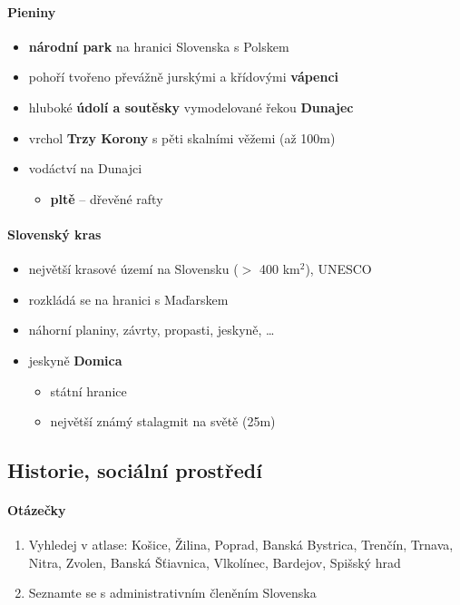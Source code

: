 \paragraph{Pieniny}
\begin{itemize}
\item \textbf{národní park} na hranici Slovenska s Polskem
\item pohoří tvořeno převážně jurskými a křídovými \textbf{vápenci}
\item hluboké \textbf{údolí a soutěsky} vymodelované řekou \textbf{Dunajec}
\item vrchol \textbf{Trzy Korony} s pěti skalními věžemi (až 100m)
\item vodáctví na Dunajci
\begin{itemize}
\item \textbf{pltě} -- dřevěné rafty
\end{itemize}
\end{itemize}

\paragraph{Slovenský kras}
\begin{itemize}
\item největší krasové území na Slovensku ($>$ 400 km$^2$), UNESCO
\item rozkládá se na hranici s Maďarskem
\item náhorní planiny, závrty, propasti, jeskyně, \ldots
\item jeskyně \textbf{Domica}
\begin{itemize}
\item státní hranice
\item největší známý stalagmit na světě (25m)
\end{itemize}
\end{itemize}


\subsection{Historie, sociální prostředí}
\paragraph{Otázečky}
\begin{enumerate}
\item Vyhledej v atlase: Košice, Žilina, Poprad, Banská Bystrica, Trenčín, Trnava, Nitra, Zvolen, Banská Šťiavnica, Vlkolínec, Bardejov, Spišský hrad
\item Seznamte se s administrativním členěním Slovenska
\end{enumerate}

